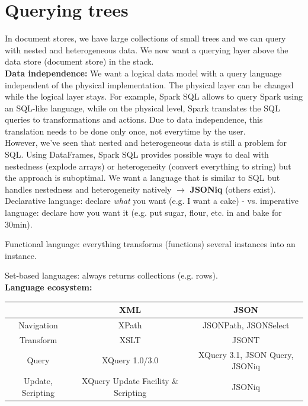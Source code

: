 \documentclass[11pt,oneside,a4paper]{article}
\begin{document}
{\newpage

\section{Querying trees}

In document stores, we have large collections of small trees and we can query with nested and heterogeneous data. We now want a querying layer above the data store (document store) in the stack.\\

\textbf{Data independence:} We want a logical data model with a query language independent of the physical implementation. The physical layer can be changed while the logical layer stays. For example, Spark SQL allows to query Spark using an SQL-like language, while on the physical level, Spark translates the SQL queries to transformations and actions. Due to data independence, this translation needs to be done only once, not everytime by the user.\\

However, we've seen that nested and heterogeneous data is still a problem for SQL. Using DataFrames, Spark SQL provides possible ways to deal with nestedness (explode arrays) or heterogeneity (convert everything to string) but the approach is suboptimal. We want a language that is similar to SQL but handles nestedness and heterogeneity natively $\rightarrow$ \textbf{JSONiq} (others exist).\\

Declarative language: declare \textit{what} you want (e.g. I want a cake) - vs. imperative language: declare how you want it (e.g. put sugar, flour, etc. in and bake for 30min).

Functional language: everything transforms (functions) several instances into an instance.

Set-based languages: always returns collections (e.g. rows).\\

\textbf{Language ecosystem:}

\begin{table}[hb!]
\begin{tabular}{|c|c|c|}
	\hline 
	& \textbf{XML} & \textbf{JSON} \\ 
	\hline 
	Navigation & XPath & JSONPath,
	JSONSelect \\ 
	\hline 
	Transform & XSLT & JSONT \\ 
	\hline 
	Query & XQuery 1.0/3.0 & XQuery 3.1,
	JSON Query,
	JSONiq \\ 
	\hline 
	Update,	Scripting & XQuery Update Facility \& Scripting & JSONiq \\ 
	\hline 
\end{tabular} 
\end{table}

}
\end{document}
